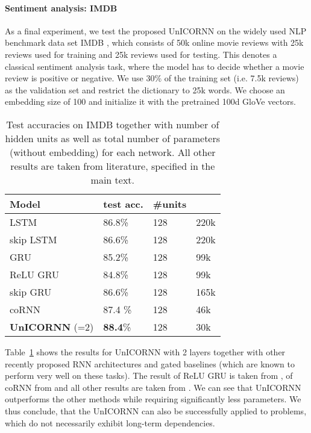 \documentclass{article}
\newcommand{\Tref}[1]{Table~\ref{#1}}
\begin{document}
\paragraph{Sentiment analysis: IMDB}
As a final experiment, we test the proposed UnICORNN on the widely used NLP benchmark data set IMDB \citep{imdb}, which consists of 50k online movie reviews with 25k reviews used for training and 25k reviews used for testing. This denotes a classical sentiment analysis task, where the model has to decide whether a movie review is positive or negative. We use 30\% of the training set (i.e. 7.5k reviews) as the validation set and restrict the dictionary to 25k words. We choose an embedding size of 100 and initialize it with the pretrained 100d GloVe \cite{glove} vectors.
\begin{table}[t]
\caption{Test accuracies on IMDB together with number of hidden units as well as total number of parameters  (without embedding) for each network. All other results are taken from literature, specified in the main text.}
\label{tab:imdb}
\vskip 0.15in
\begin{center}
\begin{small}
\begin{sc}
\begin{tabular}{llll}
\toprule
Model &  test acc. & \#units &  \\
\midrule
LSTM&  86.8\% & 128 & 220k\\
skip LSTM & 86.6\% & 128 & 220k \\
GRU & 85.2\% & 128 & 99k\\
ReLU GRU & 84.8\% & 128 & 99k \\
skip GRU & 86.6\% & 128 & 165k\\
coRNN & 87.4 \% &128 & 46k \\
\textbf{UnICORNN} (=2) & \textbf{88.4}\% & 128 & 30k\\
\bottomrule
\end{tabular}
\end{sc}
\end{small}
\end{center}
\vskip -0.1in
\end{table}
\Tref{tab:imdb} shows the results for UnICORNN with 2 layers together with other recently proposed RNN architectures and gated baselines (which are known to perform very well on these tasks). The result of ReLU GRU is taken from \cite{imdb_gru}, of coRNN from \cite{coRNN} and all other results are taken from \cite{imdb_base}. We can see that UnICORNN outperforms the other methods while requiring significantly less parameters. We thus conclude, that the UnICORNN can also be successfully applied to problems, which do not necessarily exhibit long-term dependencies.
\end{document}

